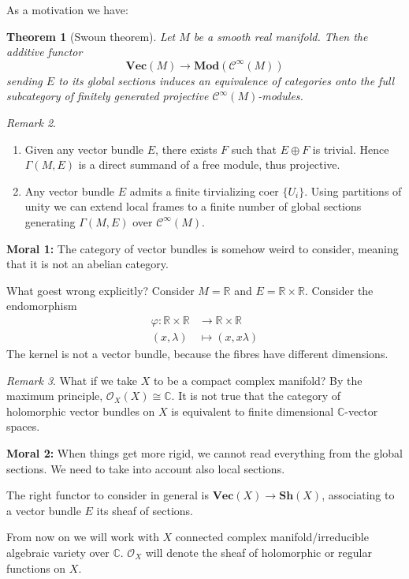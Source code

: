 \documentclass[12pt]{article}
\theoremstyle{darkgreentheorem}
\newtheorem{thm}{Theorem}[section]
\theoremstyle{darkbluedefinition}
\theoremstyle{darkredexample}
\theoremstyle{remark}
\newtheorem{rem}[thm]{Remark}
\newcommand{\R}{\mathbb{R}}
\newcommand{\1}{\mathbbm{1}}
\newcommand{\C}{\mathbb{C}}
\renewcommand{\Vec}{\mathbf{Vec}}
\newcommand{\Mod}{\mathbf{Mod}}
\newcommand{\Sh}{\mathbf{Sh}}
\newcommand{\calC}{\mathcal{C}}
\renewcommand{\O}{\mathcal{O}}
\newcommand{\op}{\oplus}
\newcommand{\tms}{\times}
\begin{document}
As a motivation we have:

\begin{thm}[Swoun theorem]
    Let $M$ be a smooth real manifold.
    Then the additive functor
    \[ \Vec(M)\to \Mod(\calC^{\infty}(M)) \]
    sending $E$ to its global sections induces an equivalence of categories onto the full subcategory of finitely generated projective $\calC^{\infty}(M)$-modules.
\end{thm}

\begin{rem}
    \begin{enumerate}
	\item Given any vector bundle $E$, there exists $F$ such that $E\op F$ is trivial.
	    Hence $\Gamma(M,E)$ is a direct summand of a free module, thus projective.
	\item Any vector bundle $E$ admits a finite tirvializing coer $\{U_{i}\}$.
	    Using partitions of unity we can extend local frames to a finite number of global sections generating $\Gamma(M,E)$ over $\calC^{\infty}(M)$.
    \end{enumerate}
\end{rem}

\textbf{Moral 1:} The category of vector bundles is somehow weird to consider, meaning that it is not an abelian category.

What goest wrong explicitly? Consider $M=\R$ and $E=\R\tms \R$.
Consider the endomorphism
\begin{align*}
    \varphi\colon\R\tms\R&\to \R\tms \R \\
    (x,\lambda)&\mapsto (x,x\lambda)
\end{align*}
The kernel is not a vector bundle, because the fibres have different dimensions.

\begin{rem}
    What if we take $X$ to be a compact complex manifold?
    By the maximum principle, $\O_{X}(X)\cong \C$.
    It is not true that the category of holomorphic vector bundles on $X$ is equivalent to finite dimensional $\C$-vector spaces.
\end{rem}

\textbf{Moral 2:} When things get more rigid, we cannot read everything from the global sections.
We need to take into account also local sections.

The right functor to consider in general is $\Vec(X)\to \Sh(X)$, associating to a vector bundle $E$ its sheaf of sections.

From now on we will work with $X$ connected complex manifold/irreducible algebraic variety over $\C$.
$\O_{X}$ will denote the sheaf of holomorphic or regular functions on $X$.
\end{document}
